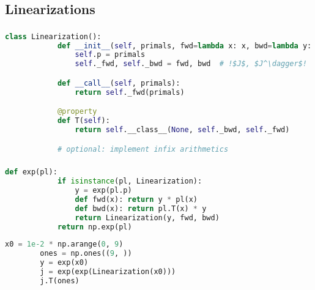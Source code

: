\documentclass[aspectratio=169,xcolor=dvipsnames]{beamer}
\begin{document}
\subsection{Linearizations}
\begin{frame}[fragile]
	\frametitle{\insertsection}
	\framesubtitle{\insertsubsection}

	\begin{lstlisting}[language=python,escapechar=!]
		class Linearization():
			def __init__(self, primals, fwd=lambda x: x, bwd=lambda y: y):
				self.p = primals
				self._fwd, self._bwd = fwd, bwd  # !$J$, $J^\dagger$!

			def __call__(self, primals):
				return self._fwd(primals)

			@property
			def T(self):
				return self.__class__(None, self._bwd, self._fwd)

			# optional: implement infix arithmetics
	\end{lstlisting}

\end{frame}

\begin{frame}[fragile]
	\frametitle{\insertsection}
	\framesubtitle{\insertsubsection}

	\begin{lstlisting}[language=python,escapechar=!]
		def exp(pl):
			if isinstance(pl, Linearization):
				y = exp(pl.p)
				def fwd(x): return y * pl(x)
				def bwd(x): return pl.T(x) * y
				return Linearization(y, fwd, bwd)
			return np.exp(pl)
	\end{lstlisting}

	\pause
	\begin{lstlisting}[language=python,escapechar=!]
		x0 = 1e-2 * np.arange(0, 9)
		ones = np.ones((9, ))
		y = exp(x0)
		j = exp(exp(Linearization(x0)))
		j.T(ones)
	\end{lstlisting}

\end{frame}
\end{document}
